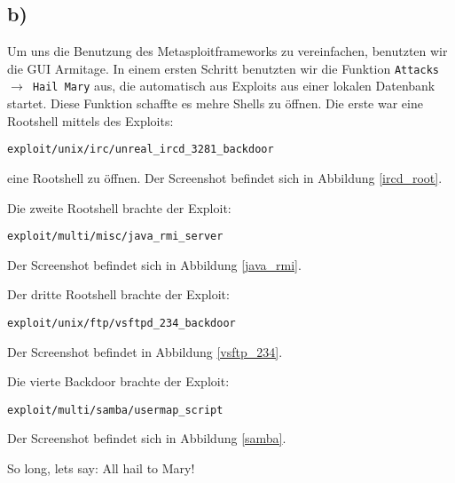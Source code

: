 \documentclass[10pt,a4paper]{article}
\begin{document}
\subsection*{b)}

Um uns die Benutzung des Metasploitframeworks zu vereinfachen, benutzten wir die GUI Armitage. In einem ersten Schritt benutzten wir die Funktion \texttt{Attacks $\rightarrow$ Hail Mary} aus, die automatisch aus Exploits aus einer lokalen Datenbank startet. Diese Funktion schaffte es mehre Shells zu öffnen. 
Die erste war eine Rootshell mittels des Exploits:
\begin{verbatim}
exploit/unix/irc/unreal_ircd_3281_backdoor
\end{verbatim}
eine Rootshell zu öffnen. Der Screenshot befindet sich in Abbildung \ref{ircd_root}.

Die zweite Rootshell brachte der Exploit:
\begin{verbatim}
exploit/multi/misc/java_rmi_server
\end{verbatim}
Der Screenshot befindet sich in Abbildung \ref{java_rmi}.

Der dritte Rootshell brachte der Exploit:
\begin{verbatim}
exploit/unix/ftp/vsftpd_234_backdoor
\end{verbatim}
Der Screenshot befindet in Abbildung \ref{vsftp_234}.

Die vierte Backdoor brachte der Exploit:
\begin{verbatim}
exploit/multi/samba/usermap_script
\end{verbatim}
Der Screenshot befindet sich in Abbildung \ref{samba}.

So long, lets say: All hail to Mary!
\end{document}
